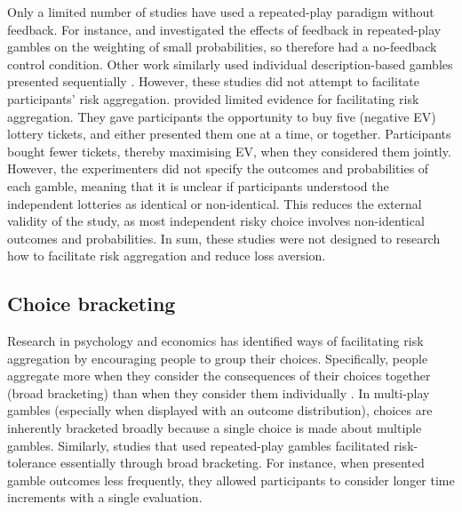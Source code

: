 \documentclass[a4paper, nobind, dvipsnames]{templates/ociamthesis}
\theoremstyle{definition}
\theoremstyle{definition}
\theoremstyle{definition}
\theoremstyle{definition}
\theoremstyle{remark}
\begin{document}
Only a limited number of studies have used a repeated-play paradigm without
feedback. For instance, \textcite{jessup2008} and \textcite{hertwig2004} investigated the effects of
feedback in repeated-play gambles on the weighting of small probabilities, so
therefore had a no-feedback control condition. Other work similarly used
individual description-based gambles presented sequentially \autocites[e.g.,][]{ert2013,joag1990}. However, these studies did not attempt to facilitate participants'
risk aggregation. \textcite{haisley2008} provided limited evidence for facilitating risk
aggregation. They gave participants the opportunity to buy five (negative EV)
lottery tickets, and either presented them one at a time, or together.
Participants bought fewer tickets, thereby maximising EV, when they considered
them jointly. However, the experimenters did not specify the outcomes and
probabilities of each gamble, meaning that it is unclear if participants
understood the independent lotteries as identical or non-identical. This reduces
the external validity of the study, as most independent risky choice involves
non-identical outcomes and probabilities. In sum, these studies were not
designed to research how to facilitate risk aggregation and reduce loss
aversion.

\subsection{Choice bracketing}

Research in psychology and economics has identified ways of facilitating risk
aggregation by encouraging people to group their choices. Specifically, people
aggregate more when they consider the consequences of their choices together
(broad bracketing) than when they consider them individually \autocite[narrow bracketing;][]{read1999}. In multi-play gambles (especially when displayed with an outcome
distribution), choices are inherently bracketed broadly because a single choice
is made about multiple gambles. Similarly, studies that used repeated-play
gambles facilitated risk-tolerance essentially through broad bracketing. For
instance, when \textcite{thaler1997} presented gamble outcomes less frequently, they
allowed participants to consider longer time increments with a single
evaluation.
\end{document}
